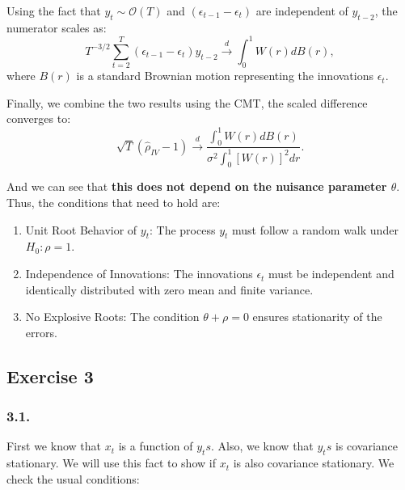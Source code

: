 \documentclass{article}
\begin{document}
Using the fact that \(y_t \sim \mathcal{O}(T)\) and \((\epsilon_{t-1} - \epsilon_t)\) are independent of \(y_{t-2}\), the numerator scales as:
\[
T^{-3/2} \sum_{t=2}^T (\epsilon_{t-1} - \epsilon_t)y_{t-2} \overset{d}{\to} \int_0^1 W(r)dB(r),
\]
where \(B(r)\) is a standard Brownian motion representing the innovations \(\epsilon_t\).

Finally, we combine the two results using the CMT, the scaled difference converges to:
\[
\sqrt{T}(\hat{\rho}_{IV} - 1) \overset{d}{\to} \frac{\int_0^1 W(r)dB(r)}{\sigma^2 \int_0^1 [W(r)]^2 dr}.
\]

And we can see that \textbf{this does not depend on the nuisance parameter $\theta$}. Thus, the conditions that need to hold are:


\begin{enumerate}
  \item Unit Root Behavior of \(y_t\): The process \(y_t\) must follow a random walk under \(H_0: \rho = 1\).
  \item Independence of Innovations: The innovations \(\epsilon_t\) must be independent and identically distributed with zero mean and finite variance.
  \item No Explosive Roots: The condition \(\theta + \rho = 0\) ensures stationarity of the errors.
\end{enumerate}



\subsection*{Exercise 3}


\subsubsection*{3.1.}
First we know that \( x_t \) is a function of \(y_ts\). Also, we know that \(y_ts\) is covariance
stationary. We will use this fact to show if \( x_t \) is also covariance stationary. We
check the usual conditions:
\end{document}
